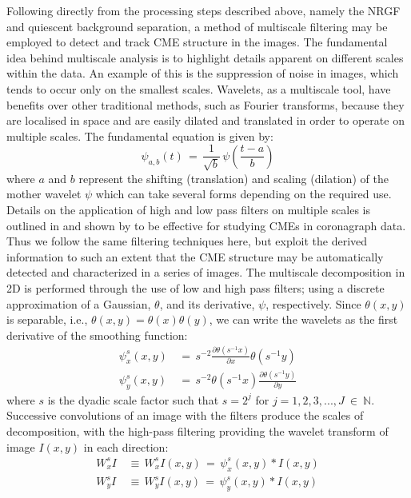 \documentclass[namedreferences]{SolarPhysics}
\begin{document}
\begin{article}
Following directly from the processing steps described above, namely the NRGF and quiescent background separation, a method of multiscale filtering may be employed to detect and track CME structure in the images. The fundamental idea behind multiscale analysis is to highlight details apparent on different scales within the data. An example of this is the suppression of noise in images, which tends to occur only on the smallest scales. Wavelets, as a multiscale tool, have benefits over other traditional methods, such as Fourier transforms, because they are localised in space and are easily dilated and translated in order to operate on multiple scales. The fundamental equation is given by:
\begin{equation}
\psi_{a,b}(t)\,=\, \frac{1}{\sqrt{b}} \, \psi (\frac{t-a}{b})
\end{equation}
where $a$ and $b$ represent the shifting (translation) and scaling (dilation) of the mother wavelet $\psi$ which can take several forms depending on the required use. Details on the application of high and low pass filters on multiple scales is outlined in \citet{2008SoPh..248..457Y} and shown by \citet{2009A&A...495..325B, 2010NatCo...1E..74B} to be effective for studying CMEs in coronagraph data. Thus we follow the same filtering techniques here, but exploit the derived information to such an extent that the CME structure may be automatically detected and characterized in a series of images. The multiscale decomposition in 2D is performed through the use of low and high pass filters; using a discrete approximation of a Gaussian, $\theta$, and its derivative, $\psi$, respectively. Since $\theta(x,y)$ is separable, i.e., $\theta(x,y)=\theta(x)\theta(y)$, we can write the wavelets as the first derivative of the smoothing function:
\begin{eqnarray}
\psi_{x}^{s}(x,y)\,&=\, s^{-2} \frac{\partial \theta(s^{-1}x)}{\partial x}\theta(s^{-1}y) \\
\psi_{y}^{s}(x,y)\,&=\, s^{-2} \theta(s^{-1}x)\frac{\partial \theta(s^{-1}y)}{\partial y}
\end{eqnarray}
where $s$ is the dyadic scale factor such that $s=2^j$ for $j=1,2,3,...,J~\in~\mathbb{N}$. Successive convolutions of an image with the filters produce the scales of decomposition, with the high-pass filtering providing the wavelet transform of image $I(x,y)$ in each direction:
\begin{eqnarray}
W_{x}^{s}I \,&\equiv\, W_{x}^s I(x,y)\,=\,\psi_{x}^s (x,y)*I(x,y) \\
W_{y}^{s}I \,&\equiv\, W_{y}^s I(x,y)\,=\,\psi_{y}^s (x,y)*I(x,y)

\end{eqnarray}
\end{article}
\end{document}
